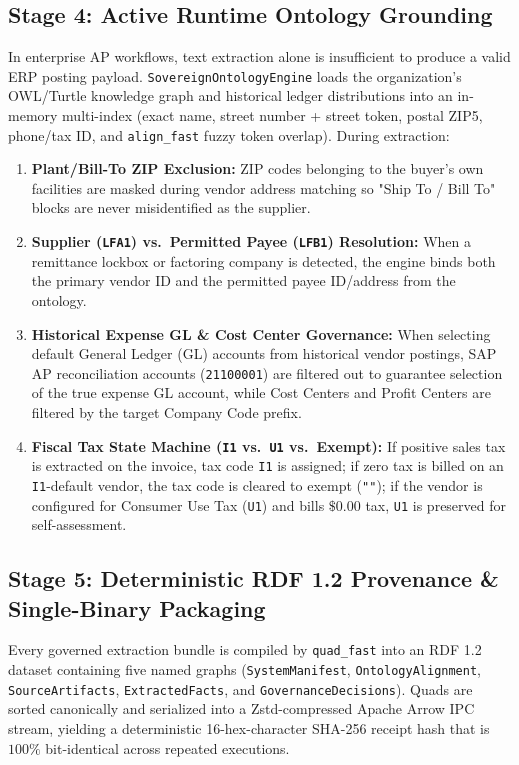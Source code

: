 \documentclass[10pt,twocolumn,letterpaper]{article}
\begin{document}
\subsection{Stage 4: Active Runtime Ontology Grounding}

In enterprise AP workflows, text extraction alone is insufficient to produce a valid ERP posting payload. \texttt{SovereignOntologyEngine} loads the organization's OWL/Turtle knowledge graph and historical ledger distributions into an in-memory multi-index (exact name, street number + street token, postal ZIP5, phone/tax ID, and \texttt{align\_fast} fuzzy token overlap). During extraction:
\begin{enumerate}[leftmargin=1.4em,itemsep=1.5pt,topsep=2pt]
    \item \textbf{Plant/Bill-To ZIP Exclusion:} ZIP codes belonging to the buyer's own facilities are masked during vendor address matching so "Ship To / Bill To" blocks are never misidentified as the supplier.
    \item \textbf{Supplier (\texttt{LFA1}) vs.\ Permitted Payee (\texttt{LFB1}) Resolution:} When a remittance lockbox or factoring company is detected, the engine binds both the primary vendor ID and the permitted payee ID/address from the ontology.
    \item \textbf{Historical Expense GL \& Cost Center Governance:} When selecting default General Ledger (GL) accounts from historical vendor postings, SAP AP reconciliation accounts (\texttt{21100001}) are filtered out to guarantee selection of the true expense GL account, while Cost Centers and Profit Centers are filtered by the target Company Code prefix.
    \item \textbf{Fiscal Tax State Machine (\texttt{I1} vs.\ \texttt{U1} vs.\ Exempt):} If positive sales tax is extracted on the invoice, tax code \texttt{I1} is assigned; if zero tax is billed on an \texttt{I1}-default vendor, the tax code is cleared to exempt (\texttt{""}); if the vendor is configured for Consumer Use Tax (\texttt{U1}) and bills $\$0.00$ tax, \texttt{U1} is preserved for self-assessment.
\end{enumerate}

\subsection{Stage 5: Deterministic RDF 1.2 Provenance \& Single-Binary Packaging}

Every governed extraction bundle is compiled by \texttt{quad\_fast} into an RDF 1.2 dataset containing five named graphs (\texttt{SystemManifest}, \texttt{OntologyAlignment}, \texttt{SourceArtifacts}, \texttt{ExtractedFacts}, and \texttt{GovernanceDecisions}). Quads are sorted canonically and serialized into a Zstd-compressed Apache Arrow IPC stream, yielding a deterministic 16-hex-character SHA-256 receipt hash that is $100\%$ bit-identical across repeated executions.
\end{document}
